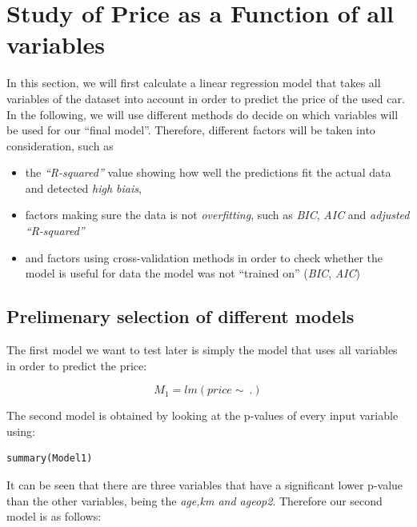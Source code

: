\section{Study of Price as a Function of all variables} %
\label{sec:study_of_price_as_a_function_of_all_variables}

In this section, we will first calculate a linear regression model 
that takes all variables of the dataset into account in order to
predict the price of the used car. In the following, we will use different 
methods do decide on which variables will be used for our ``final model''. 
Therefore, different factors will be taken into consideration, such as

\begin{itemize}
	\item the \emph{``R-squared''} value showing how well the predictions fit the actual data and detected \emph{high biais},
	\item factors making sure the data is not \emph{overfitting}, such as 
	\emph{BIC}, \emph{AIC} and \emph{adjusted ``R-squared''}
	\item and factors using cross-validation methods in order to check 
	whether the model is useful for data the model was not ``trained on'' 
	(\emph{BIC}, \emph{AIC})
\end{itemize}

\subsection{Prelimenary selection of different models} %
\label{sub:prelimenary_selection_of_different_models}

The first model we want to test later is simply the model that uses all 
variables in order to predict the price: 

\begin{equation}\label{eq:model1}
	M_1 = lm(price \sim\ .)
\end{equation}

The second model is obtained by looking at the p-values of every input 
variable using:

\begin{lstlisting}[caption={summary() in R},label={lst:summary_func}]
	summary(Model1)
\end{lstlisting}

It can be seen that there are three variables that have a significant lower 
p-value than the other variables, being the \emph{age,km and ageop2}.
Therefore our second model is as follows:

